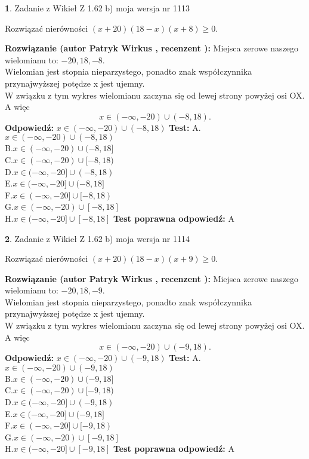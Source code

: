 \documentclass[12pt, a4paper]{article}
\theoremstyle{definition} %
\newtheorem{zad}{}
\newcommand{\zadStart}[1]{\begin{zad}#1\newline}
\newcommand{\zadStop}{\end{zad}}
\newcommand{\rozwStart}[2]{\noindent \textbf{Rozwiązanie (autor #1 , recenzent #2): }\newline}
\newcommand{\rozwStop}{\newline}
\newcommand{\odpStart}{\noindent \textbf{Odpowiedź:}\newline}
\newcommand{\odpStop}{\newline}
\newcommand{\testStart}{\noindent \textbf{Test:}\newline}
\newcommand{\testStop}{\newline}
\newcommand{\kluczStart}{\noindent \textbf{Test poprawna odpowiedź:}\newline}
\newcommand{\kluczStop}{\newline}
\begin{document}
\zadStart{Zadanie z Wikieł Z 1.62 b) moja wersja nr 1113}

Rozwiązać nierówności $(x+20)(18-x)(x+8)\ge0$.
\zadStop
\rozwStart{Patryk Wirkus}{}
Miejsca zerowe naszego wielomianu to: $-20, 18, -8$.\\
Wielomian jest stopnia nieparzystego, ponadto znak współczynnika przy\linebreak najwyższej potędze x jest ujemny.\\ W związku z tym wykres wielomianu zaczyna się od lewej strony powyżej osi OX. A więc $$x \in (-\infty,-20) \cup (-8,18).$$
\rozwStop
\odpStart
$x \in (-\infty,-20) \cup (-8,18)$
\odpStop
\testStart
A.$x \in (-\infty,-20) \cup (-8,18)$\\
B.$x \in (-\infty,-20) \cup (-8,18]$\\
C.$x \in (-\infty,-20) \cup [-8,18)$\\
D.$x \in (-\infty,-20] \cup (-8,18)$\\
E.$x \in (-\infty,-20] \cup (-8,18]$\\
F.$x \in (-\infty,-20] \cup [-8,18)$\\
G.$x \in (-\infty,-20) \cup [-8,18]$\\
H.$x \in (-\infty,-20] \cup [-8,18]$
\testStop
\kluczStart
A
\kluczStop



\zadStart{Zadanie z Wikieł Z 1.62 b) moja wersja nr 1114}

Rozwiązać nierówności $(x+20)(18-x)(x+9)\ge0$.
\zadStop
\rozwStart{Patryk Wirkus}{}
Miejsca zerowe naszego wielomianu to: $-20, 18, -9$.\\
Wielomian jest stopnia nieparzystego, ponadto znak współczynnika przy\linebreak najwyższej potędze x jest ujemny.\\ W związku z tym wykres wielomianu zaczyna się od lewej strony powyżej osi OX. A więc $$x \in (-\infty,-20) \cup (-9,18).$$
\rozwStop
\odpStart
$x \in (-\infty,-20) \cup (-9,18)$
\odpStop
\testStart
A.$x \in (-\infty,-20) \cup (-9,18)$\\
B.$x \in (-\infty,-20) \cup (-9,18]$\\
C.$x \in (-\infty,-20) \cup [-9,18)$\\
D.$x \in (-\infty,-20] \cup (-9,18)$\\
E.$x \in (-\infty,-20] \cup (-9,18]$\\
F.$x \in (-\infty,-20] \cup [-9,18)$\\
G.$x \in (-\infty,-20) \cup [-9,18]$\\
H.$x \in (-\infty,-20] \cup [-9,18]$
\testStop
\kluczStart
A
\kluczStop
\end{document}
